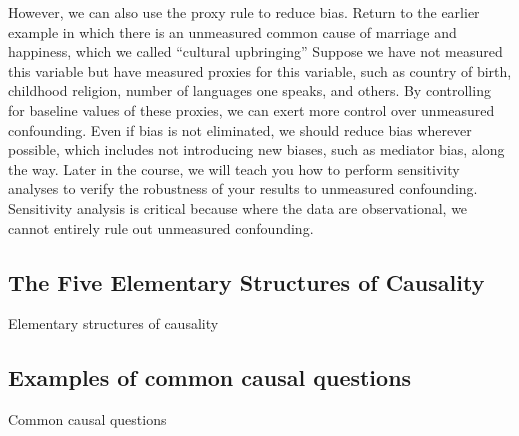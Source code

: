 \documentclass[
  single column]{article}
\begin{document}
However, we can also use the proxy rule to reduce bias. Return to the
earlier example in which there is an unmeasured common cause of marriage
and happiness, which we called ``cultural upbringing'' Suppose we have
not measured this variable but have measured proxies for this variable,
such as country of birth, childhood religion, number of languages one
speaks, and others. By controlling for baseline values of these proxies,
we can exert more control over unmeasured confounding. Even if bias is
not eliminated, we should reduce bias wherever possible, which includes
not introducing new biases, such as mediator bias, along the way. Later
in the course, we will teach you how to perform sensitivity analyses to
verify the robustness of your results to unmeasured confounding.
Sensitivity analysis is critical because where the data are
observational, we cannot entirely rule out unmeasured confounding.

\newpage{}

\subsection{The Five Elementary Structures of
Causality}\label{the-five-elementary-structures-of-causality-1}

\begin{table}

\caption{\label{tbl-dags}Elementary structures of causality}

\centering{

\terminologydirectedgraph

}

\end{table}%

\newpage{}

\subsection{Examples of common causal
questions}\label{examples-of-common-causal-questions}

\begin{table}

\caption{\label{tbl-common-interests}Common causal questions}

\centering{

\terminologycommoncausalinterests

}

\end{table}%

\newpage{}
\end{document}
